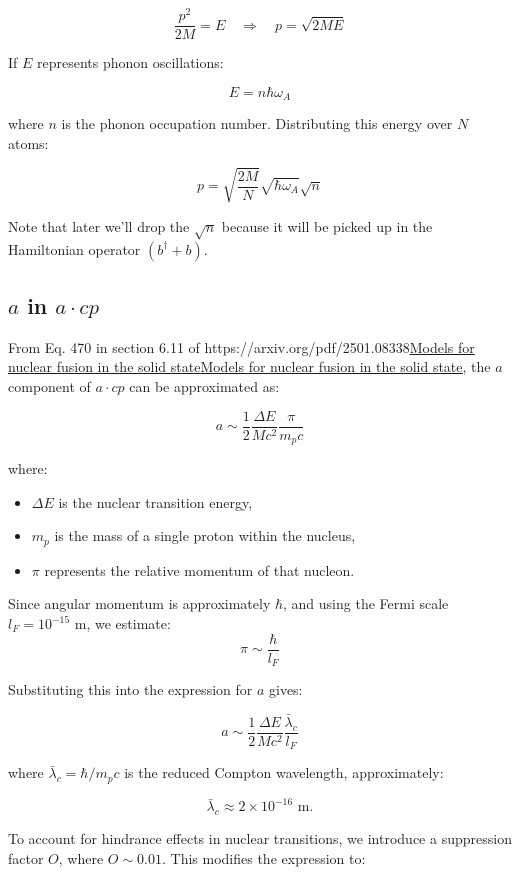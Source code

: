 \documentclass[
]{article}
\let\oldhref\href
\renewcommand{\href}[2]{\ifx#1\urlprefix\oldhref{#1}{#2}\else\uline{\oldhref{#1}{#2}}\fi}
\renewcommand{\[}{\begin{equation}}
\renewcommand{\]}{\end{equation}}
\providecommand{\tightlist}{%
  \setlength{\itemsep}{0pt}\setlength{\parskip}{0pt}}
\begin{document}
\[
\frac{p^2}{2M} = E \quad \Rightarrow \quad p = \sqrt{2ME}
\]

If \(E\) represents phonon oscillations:

\[
E = n \hbar \omega_A 
\]

where \(n\) is the phonon occupation number. Distributing this energy
over \(N\) atoms:

\[
p = \sqrt{\frac{2M}{N}} \sqrt{\hbar \omega_A} \sqrt{n} \label{eq:p}
\]

Note that later we'll drop the \(\sqrt{n}\) because it will be picked up
in the Hamiltonian operator \((b^{\dagger} + b)\).

\subsection{\texorpdfstring{\(a\) in
\(a \cdot cp\)}{a in a \textbackslash cdot cp}}\label{a-in-a-cdot-cp}

From Eq. 470 in section 6.11 of
\href{https://arxiv.org/pdf/2501.08338}{Models for nuclear fusion in the
solid state}, the \(a\) component of \(a \cdot cp\) can be approximated
as:

\[
a \sim \frac{1}{2} \frac{\Delta E}{M c^2} \frac{\pi}{m_p c}
\]

where:

\begin{itemize}
\tightlist
\item
  \(\Delta E\) is the nuclear transition energy,
\item
  \(m_p\) is the mass of a single proton within the nucleus,
\item
  \(\pi\) represents the relative momentum of that nucleon.
\end{itemize}

Since angular momentum is approximately \(\hbar\), and using the Fermi
scale \(l_F = 10^{-15}\) m, we estimate: \[
\pi \sim \frac{\hbar}{l_F} 
\]

Substituting this into the expression for \(a\) gives:

\[
a \sim \frac{1}{2} \frac{\Delta E}{M c^2} \frac{\bar\lambda_c}{l_F}
\]

where \(\bar\lambda_c = \hbar / m_p c\) is the reduced Compton
wavelength, approximately:

\[
\bar\lambda_c \approx 2 \times 10^{-16} \text{ m}.
\]

To account for hindrance effects in nuclear transitions, we introduce a
suppression factor \(O\), where \(O \sim 0.01\). This modifies the
expression to:
\end{document}
